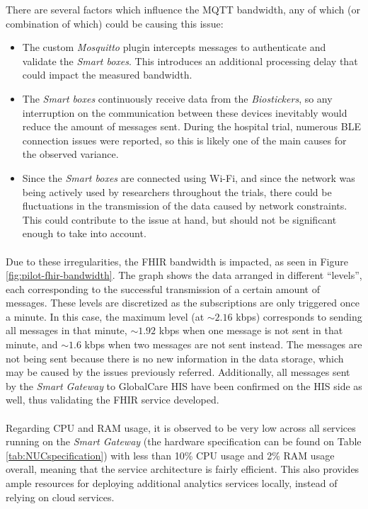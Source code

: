 There are several factors which influence the \acs{MQTT} bandwidth, any of which (or combination of which) could be causing this issue:

\begin{itemize}
    \item The custom \textit{Mosquitto} plugin intercepts messages to authenticate and validate the \textit{Smart boxes}. This introduces an additional processing delay that could impact the measured bandwidth.
    \item The \textit{Smart boxes} continuously receive data from the \textit{Biostickers}, so any interruption on the communication between these devices inevitably would reduce the amount of messages sent. During the hospital trial, numerous \acs{BLE} connection issues were reported, so this is likely one of the main causes for the observed variance.
    \item Since the \textit{Smart boxes} are connected using Wi-Fi, and since the network was being actively used by researchers throughout the trials, there could be fluctuations in the transmission of the data caused by network constraints. This could contribute to the issue at hand, but should not be significant enough to take into account.
\end{itemize}

\paragraph{} Due to these irregularities, the \acs{FHIR} bandwidth is impacted, as seen in Figure \ref{fig:pilot-fhir-bandwidth}. The graph shows the data arranged in different ``levels'', each corresponding to the successful transmission of a certain amount of messages. These levels are discretized as the subscriptions are only triggered once a minute. In this case, the maximum level (at {\color{blue} ${\sim} 2.16$ kbps}) corresponds to sending all messages in that minute, {\color{blue} ${\sim} 1.92$ kbps} when one message is not sent in that minute, and {\color{blue} ${\sim} 1.6$ kbps} when two messages are not sent instead. The messages are not being sent because there is no new information in the data storage, which may be caused by the issues previously referred. Additionally, all messages sent by the \textit{Smart Gateway} to GlobalCare \acs{HIS} have been confirmed on the \acs{HIS} side as well, thus validating the \acs{FHIR} service developed.  

\paragraph{} Regarding \acs{CPU} and \acs{RAM} usage, it is observed to be very low across all services running on the \textit{Smart Gateway} (the hardware specification can be found on Table \ref{tab:NUCspecification}) with less than 10\% \acs*{CPU} usage and 2\% \acs*{RAM} usage overall, meaning that the service architecture is fairly efficient. This also provides ample resources for deploying additional analytics services locally, instead of relying on cloud services.

